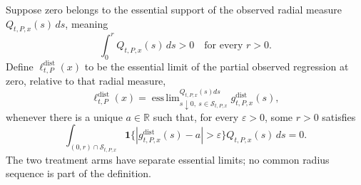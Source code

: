 Suppose zero belongs to the essential support of the observed radial measure \(Q_{t,P,x}(s)\,ds\), meaning
\[
 \int_0^rQ_{t,P,x}(s)\,ds>0
 \quad\text{for every }r>0.
\]
Define \(\ell^{\mathrm{dist}}_{t,P}(x)\) to be the essential limit of the partial observed regression at zero, relative to that radial measure,
\[
 \ell^{\mathrm{dist}}_{t,P}(x)
 =\mathop{\operatorname{ess\,lim}}_{s\downarrow0,\ s\in\mathcal S_{t,P,x}}^{Q_{t,P,x}(s)ds}
 g^{\mathrm{dist}}_{t,P,x}(s),
\]
whenever there is a unique \(a\in\mathbb R\) such that, for every \(\varepsilon>0\), some \(r>0\) satisfies
\[
 \int_{(0,r)\cap\mathcal S_{t,P,x}}
 \mathbf 1\{|g^{\mathrm{dist}}_{t,P,x}(s)-a|>\varepsilon\}
 Q_{t,P,x}(s)\,ds=0.
\]
The two treatment arms have separate essential limits; no common radius sequence is part of the definition.